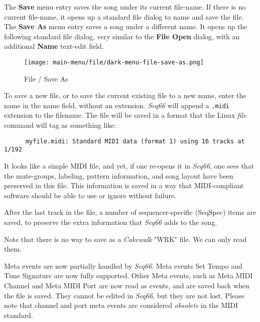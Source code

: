   The \textbf{Save} menu entry saves the song under its current file-name.
   If there is no current file-name, it opens up a standard file
   dialog to name and save the file.
   The \textbf{Save As} menu entry saves a song under a different name.
   It opens up the following standard file dialog, very similar to the 
   \textbf{File Open} dialog, with an additional \textbf{Name} text-edit field.

\begin{figure}[H]
   \centering 
   \texttt{[image: main-menu/file/dark-menu-file-save-as.png]}
   \caption{File / Save As}
   \label{fig:seq66_menu_file_save_as}
\end{figure}

   To save a new file, or to save the current existing file to a new name,
   enter the name in the name field, without an extension.
   \textsl{Seq66} will append a \texttt{.midi} extension to the filename.
   The file will be saved in a format that the Linux \textsl{file} command
   will tag as something like:

   \begin{verbatim}
      myfile.midi: Standard MIDI data (format 1) using 16 tracks at 1/192
   \end{verbatim}

   It looks like a simple MIDI file, and yet, if one re-opens it in
   \textsl{Seq66}, one sees that the mute-groups, labeling, pattern
   information, and song layout have been preserved in this file.
   This information is saved in a way that MIDI-compliant software
   should be able to use or ignore without failure.

   After the last track in the file, a number of
   sequencer-specific (SeqSpec) items are saved, to preserve
   the extra information that \textsl{Seq66} adds to the song.

   Note that there is no way to save as a \textsl{Cakewalk} "WRK" file.
   We can only read them.

   Meta events are now partially handled by \textsl{Seq66}.
   Meta events Set Tempo
   and Time Signature
   are now fully supported.
   Other Meta events,
   such as Meta MIDI Channel
   and Meta MIDI Port
   are now read as events, and are saved back when the file is saved.
   They cannot be edited in \textsl{Seq66}, but they are not lost.
   Please note that channel and port meta events are
   considered \textsl{obsolete} in the MIDI standard.

